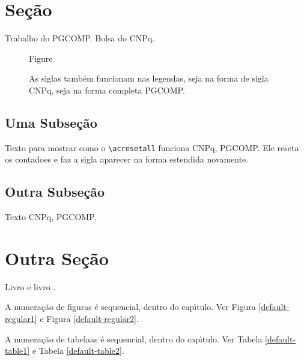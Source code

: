 \documentclass[phd, classic, a4paper]{ufbathesis}
\begin{document}

\acresetall 

\section{Se\c{c}\~{a}o}
Trabalho do  \ac{PGCOMP}. Bolsa do \ac{CNPq}.

 \begin{figure}[h]
 Figure
 \caption{As siglas também funcionam nas legendas, seja na forma de sigla \ac{CNPq}, seja na forma completa \acf{PGCOMP}.}
 \end{figure}

\lipsum

\subsection{Uma Subse\c{c}\~{a}o}
\acresetall
Texto para mostrar como o \verb|\acresetall| funciona \ac{CNPq}, \ac{PGCOMP}. Ele reseta os contadoes e faz a sigla aparecer na forma estendida novamente.

\subsection{Outra Subse\c{c}\~{a}o}

Texto  \acf{CNPq}, \acf{PGCOMP}.

\section{Outra Se\c{c}\~{a}o}
\lipsum


\lipsum

Livro \cite{demeyer2008} e  livro \cite{raymond1999}.


A numera\c{c}\~{a}o de figuras \'{e} sequencial, dentro do cap\'{\i}tulo. Ver Figura \ref{default-regular1} e Figura \ref{default-regular2}.

A numera\c{c}\~{a}o de tabelaas \'{e} sequencial, dentro do cap\'{\i}tulo. Ver Tabela \ref{default-table1} e Tabela \ref{default-table2}.
\end{document}
